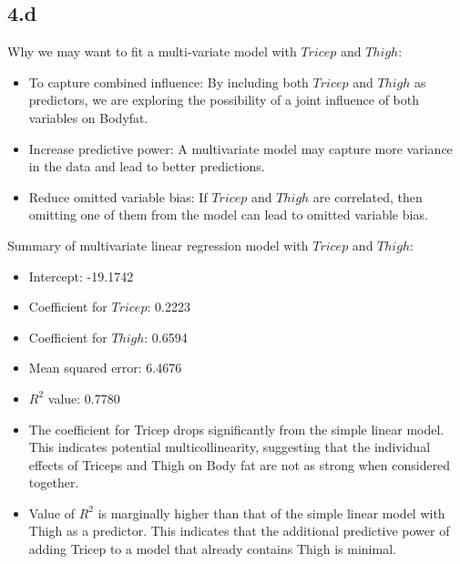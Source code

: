 \documentclass[12pt]{article}
\begin{document}
\subsection*{4.d}
Why we may want to fit a multi-variate model with \(Tricep\) and \(Thigh\):
\begin{itemize}
    \item To capture combined influence: By including both \(Tricep\) and \(Thigh\)
    as predictors, we are exploring the possibility of a joint influence of both
    variables on Bodyfat.
    \item Increase predictive power: A multivariate model may capture more
    variance in the data and lead to better predictions.
    \item Reduce omitted variable bias: If \(Tricep\) and \(Thigh\) are correlated,
    then omitting one of them from the model can lead to omitted variable bias.
\end{itemize}
Summary of multivariate linear regression model with \(Tricep\) and \(Thigh\):
\begin{itemize}
    \item Intercept: -19.1742
    \item Coefficient for \(Tricep\): 0.2223
    \item Coefficient for \(Thigh\): 0.6594
    \item Mean squared error: 6.4676
    \item \(R^2\) value: 0.7780
    \item The coefficient for Tricep drops significantly from the simple linear
    model. This indicates potential multicollinearity, suggesting that the
    individual effects of Triceps and Thigh on Body fat are not as strong
    when considered together.
    \item Value of \(R^2\) is marginally higher than that of the simple linear
    model with Thigh as a predictor. This indicates that the additional
    predictive power of adding Tricep to a model that already contains Thigh
    is minimal.
\end{itemize}

\newpage
\end{document}
